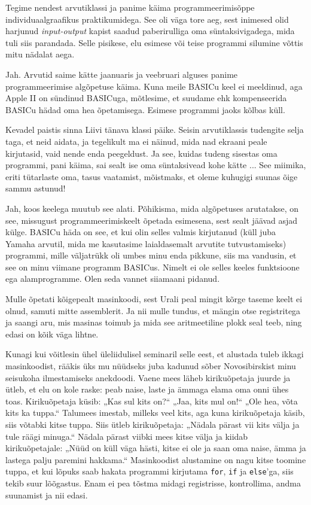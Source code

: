 Tegime nendest arvutiklassi ja panime käima 
programmeerimisõppe individuaalgraafikus praktikumidega. See oli väga 
tore aeg, sest inimesed olid harjunud \emph{input-output} kapist saadud paberirulliga oma süntaksivigadega, mida tuli siis parandada. 
Selle pisikese, elu esimese või teise programmi silumine võttis mitu 
nädalat aega. 


Jah. Arvutid saime kätte jaanuaris ja veebruari alguses panime 
programmeerimise algõpetuse käima. Kuna meile BASICu keel ei 
meeldinud, aga Apple II on sündinud BASICuga, mõtlesime, et 
suudame ehk kompenseerida BASICu hädad oma hea õpetamisega. Esimese 
programmi jaoks kõlbas küll. 

Kevadel paistis sinna Liivi tänava klassi päike. Seisin arvutiklassis tudengite 
selja taga, et neid aidata, ja tegelikult ma ei näinud, mida nad 
ekraani peale kirjutasid, vaid nende enda peegeldust. Ja see, kuidas tudeng 
sisestas oma programmi, pani käima, sai sealt ise oma süntaksivead kohe kätte ... 
See miimika, eriti tütarlaste oma, tasus vaatamist, mõistmaks, et oleme kuhugigi suunas õige sammu astunud! 


Jah, koos keelega muutub see alati. Põhikisma, mida algõpetuses arutatakse, on 
see, missugust programmeerimiskeelt õpetada esimesena, sest sealt jäävad 
asjad külge. BASICu häda on see, et kui olin selles
valmis kirjutanud (küll juba Yamaha arvutil, mida me kasutasime laialdasemalt 
arvutite tutvustamiseks) programmi, mille väljatrükk oli umbes minu enda 
pikkune, siis ma vandusin, et see on minu viimane programm BASICus. Nimelt ei ole selles keeles 
funktsioone ega alamprogramme. Olen seda vannet siiamaani pidanud. 

Mulle õpetati kõigepealt masinkoodi, sest Urali 
peal mingit kõrge taseme keelt ei olnud, samuti mitte assemblerit. Ja nii 
mulle tundus, et mängin otse registritega ja 
saangi aru, mis masinas toimub ja mida see aritmeetiline plokk seal teeb, ning edasi on kõik väga lihtne. 

Kunagi kui võitlesin ühel üleliidulisel 
seminaril selle eest, et alustada tuleb ikkagi masinkoodist, rääkis üks mu nüüdseks 
juba kadunud sõber Novosibirskist minu seisukoha 
ilmestamiseks anekdoodi. Vaene mees läheb 
kirikuõpetaja juurde ja ütleb, et elu on kole raske: peab naise, laste ja ämmaga
elama oma onni ühes toas. Kirikuõpetaja 
küsib: „Kas sul kits on?“ „Jaa, kits mul on!“ „Ole hea, võta kits ka tuppa.“ Talumees imestab, milleks veel kits, aga kuna kirikuõpetaja käsib, siis võtabki 
kitse tuppa. Siis ütleb kirikuõpetaja: „Nädala pärast vii kits välja 
ja tule räägi minuga.“ Nädala pärast viibki mees kitse välja ja kiidab kirikuõpetajale:
„Nüüd on küll väga hästi, kitse ei ole ja saan oma naise, ämma ja lastega palju paremini hakkama.“ Masinkoodist alustamine on 
nagu kitse toomine tuppa, et kui lõpuks saab hakata programmi kirjutama 
\verb|for|, \verb|if| ja \verb|else|'ga, siis tekib suur lõõgastus. Enam ei pea 
tõstma midagi registrisse, kontrollima, andma suunamist ja nii edasi. 

